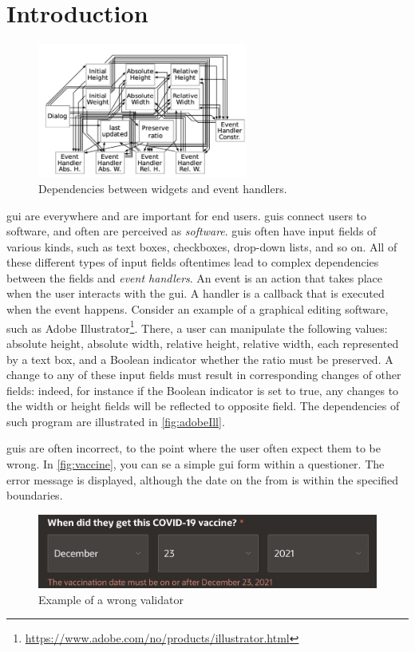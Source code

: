 \chapter{Introduction}

\begin{figure}
    \includegraphics[width=6.9cm, frame]{figures/adobeIll.png}
    \caption{Dependencies between widgets and event handlers.}
    \label{fig:adobeIll}
\end{figure}

\gls{gui} are everywhere and are important for end users. \gls{gui}s connect users to software, and often are perceived as \emph{software}. \gls{gui}s often have input fields of various kinds, such as text boxes, checkboxes, drop-down lists, and so on. All of these different types of input fields oftentimes lead to complex dependencies between the fields and \textit{event handlers}. An event is an action that takes place when the user interacts with the \gls{gui}. A handler is a callback that is executed when the event happens. Consider an example of a graphical editing software, such as Adobe Illustrator\footnote{\url{https://www.adobe.com/no/products/illustrator.html}}.  There, a user can manipulate the following values: absolute height, absolute width, relative height, relative width, each represented by a text box, and a Boolean indicator whether the ratio must be preserved. A change to any of these input fields must result in corresponding changes of other fields: indeed, for instance if the Boolean indicator is set to true, any changes to the width or height fields will be reflected to opposite field. The dependencies of such program are illustrated in \autoref{fig:adobeIll}.

\gls{gui}s are often incorrect, to the point where the user often expect them to be wrong. In \autoref{fig:vaccine}, you can se a simple \gls{gui} form within a questioner. The error message is displayed, although the date on the from is within the specified boundaries.

\begin{figure}
    \centering
    \includegraphics[scale=0.35, frame]{figures/vaccine.jpeg}
    \caption{Example of a wrong validator}
    \label{fig:vaccine}
\end{figure}

